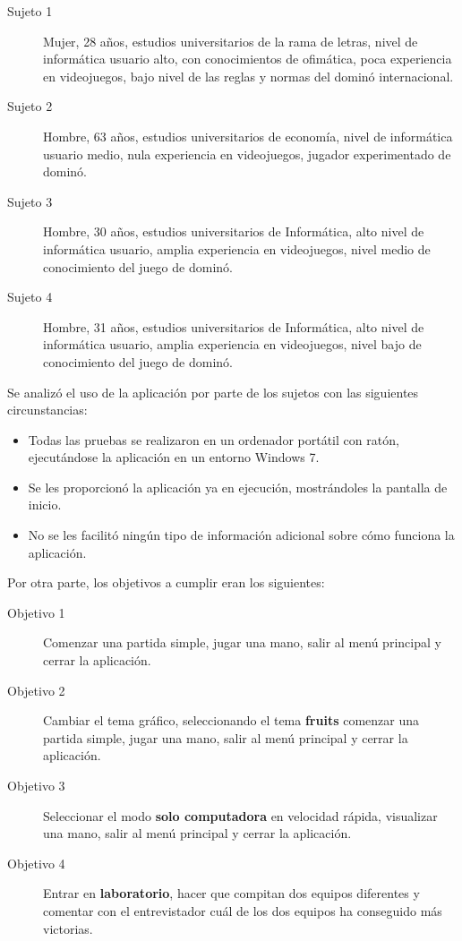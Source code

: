 \begin{description}
    \item[Sujeto 1] Mujer, 28 años, estudios universitarios de la rama de letras, nivel de informática usuario alto, con conocimientos
        de ofimática, poca experiencia en videojuegos, bajo nivel de las reglas y normas del dominó internacional.
    \item[Sujeto 2] Hombre, 63 años, estudios universitarios de economía, nivel de informática usuario medio, nula experiencia en
        videojuegos, jugador experimentado de dominó.
    \item[Sujeto 3] Hombre, 30 años, estudios universitarios de Informática, alto nivel de informática usuario, amplia experiencia
        en videojuegos, nivel medio de conocimiento del juego de dominó.
    \item[Sujeto 4] Hombre, 31 años, estudios universitarios de Informática, alto nivel de informática usuario, amplia experiencia
        en videojuegos, nivel bajo de conocimiento del juego de dominó.

\end{description}

Se analizó el uso de la aplicación por parte de los sujetos con las siguientes circunstancias:

\begin{itemize}
    \item Todas las pruebas se realizaron en un ordenador portátil con ratón, ejecutándose la aplicación en un entorno Windows 7.
    \item Se les proporcionó la aplicación ya en ejecución, mostrándoles la pantalla de inicio.
    \item No se les facilitó ningún tipo de información adicional sobre cómo funciona la aplicación.
\end{itemize}

Por otra parte, los objetivos a cumplir eran los siguientes:

\begin{description}
    \item[Objetivo 1] Comenzar una partida simple, jugar una mano, salir al menú principal y cerrar la aplicación.
    \item[Objetivo 2] Cambiar el tema gráfico, seleccionando el tema \textbf{fruits} comenzar una partida simple,
            jugar una mano, salir al menú principal y cerrar la aplicación.
    \item[Objetivo 3] Seleccionar el modo \textbf{solo computadora} en velocidad rápida, visualizar una mano, salir
            al menú principal y cerrar la aplicación.
    \item[Objetivo 4] Entrar en \textbf{laboratorio}, hacer que compitan dos equipos diferentes y comentar con el
            entrevistador cuál de los dos equipos ha conseguido más victorias.
\end{description}

